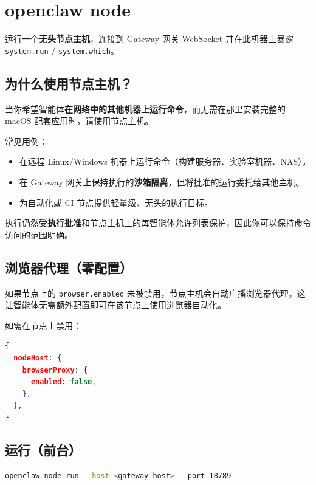 \clearpage

\section{openclaw node}


运行一个\textbf{无头节点主机}，连接到 Gateway 网关 WebSocket 并在此机器上暴露
\texttt{system.run} / \texttt{system.which}。

\subsection{为什么使用节点主机？}


当你希望智能体\textbf{在网络中的其他机器上运行命令}，而无需在那里安装完整的 macOS 配套应用时，请使用节点主机。

常见用例：

\begin{itemize}
  \item 在远程 Linux/Windows 机器上运行命令（构建服务器、实验室机器、NAS）。
  \item 在 Gateway 网关上保持执行的\textbf{沙箱隔离}，但将批准的运行委托给其他主机。
  \item 为自动化或 CI 节点提供轻量级、无头的执行目标。
\end{itemize}


执行仍然受\textbf{执行批准}和节点主机上的每智能体允许列表保护，因此你可以保持命令访问的范围明确。

\subsection{浏览器代理（零配置）}


如果节点上的 \texttt{browser.enabled} 未被禁用，节点主机会自动广播浏览器代理。这让智能体无需额外配置即可在该节点上使用浏览器自动化。

如需在节点上禁用：

\begin{lstlisting}[language=json]
{
  nodeHost: {
    browserProxy: {
      enabled: false,
    },
  },
}
\end{lstlisting}


\subsection{运行（前台）}


\begin{lstlisting}[language=bash]
openclaw node run --host <gateway-host> --port 18789
\end{lstlisting}


